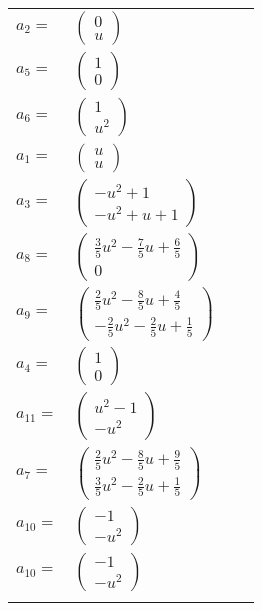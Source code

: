 \documentclass[1p]{elsarticle_modified}
\theoremstyle{definition}
\begin{document}
\begin{tabular}{m{7pt} m{180pt} m{7pt} m{180pt} }
\flushright $a_{2}=$&$\begin{pmatrix}0\\u\end{pmatrix}$ \\
\flushright $a_{5}=$&$\begin{pmatrix}1\\0\end{pmatrix}$ \\
\flushright $a_{6}=$&$\begin{pmatrix}1\\u^2\end{pmatrix}$ \\
\flushright $a_{1}=$&$\begin{pmatrix}u\\u\end{pmatrix}$ \\
\flushright $a_{3}=$&$\begin{pmatrix}- u^2+1\\- u^2+u+1\end{pmatrix}$ \\
\flushright $a_{8}=$&$\begin{pmatrix}\frac{3}{5} u^2-\frac{7}{5} u+\frac{6}{5}\\0\end{pmatrix}$ \\
\flushright $a_{9}=$&$\begin{pmatrix}\frac{2}{5} u^2-\frac{8}{5} u+\frac{4}{5}\\-\frac{2}{5} u^2-\frac{2}{5} u+\frac{1}{5}\end{pmatrix}$ \\
\flushright $a_{4}=$&$\begin{pmatrix}1\\0\end{pmatrix}$ \\
\flushright $a_{11}=$&$\begin{pmatrix}u^2-1\\- u^2\end{pmatrix}$ \\
\flushright $a_{7}=$&$\begin{pmatrix}\frac{2}{5} u^2-\frac{8}{5} u+\frac{9}{5}\\\frac{3}{5} u^2-\frac{2}{5} u+\frac{1}{5}\end{pmatrix}$ \\
\flushright $a_{10}=$&$\begin{pmatrix}-1\\- u^2\end{pmatrix}$\\ \flushright $a_{10}=$&$\begin{pmatrix}-1\\- u^2\end{pmatrix}$\\&\end{tabular}
\end{document}
